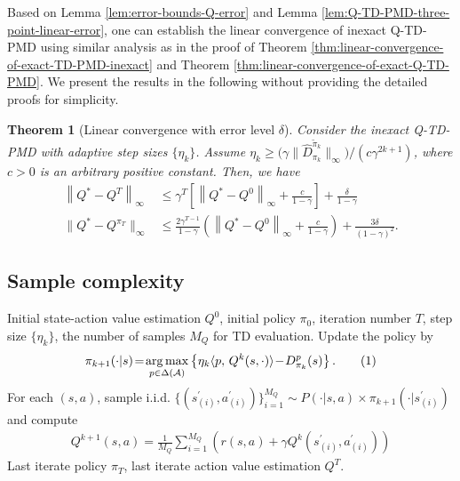 \documentclass[10pt]{article}
\newcommand{\calA}{\mathcal{A}}
\newcommand{\ls}{\left}
\newcommand{\rs}{\right}
\newcommand\numberthis{\addtocounter{equation}{1}\tag{\theequation}}
\theoremstyle{plain}
\newtheorem{theorem}{Theorem}[section]
\theoremstyle{definition}
\begin{document}
Based on Lemma \ref{lem:error-bounds-Q-error} and  Lemma \ref{lem:Q-TD-PMD-three-point-linear-error}, one can establish the linear convergence of inexact Q-TD-PMD using similar analysis as in the proof of Theorem \ref{thm:linear-convergence-of-exact-TD-PMD-inexact} and Theorem \ref{thm:linear-convergence-of-exact-Q-TD-PMD}. We present the results in the following without providing the detailed proofs for simplicity. 

\begin{theorem}[Linear convergence with error level $\delta$]
    \label{thm:linear-convergence-of-exact-Q-TD-PMD-inexact}
    Consider the inexact Q-TD-PMD  with adaptive step sizes $\{\eta_k\}$. Assume $\eta_k \geq {(\gamma\| {\hat{D}}_{\pi_k}^{\tilde{\pi}_k} \|_\infty})/{(c \gamma^{2k+1})}$, where $c > 0$ is an arbitrary positive constant. Then, we have
    \begin{align*}
        \ls\| Q^* - Q^T \rs\|_\infty &\leq \gamma^T \ls[ \ls\| Q^* - Q^0 \rs\|_\infty + \frac{c}{1-\gamma} \rs] + \frac{\delta}{1-\gamma} \\
\| Q^*-Q^{\pi _T}\| _{\infty}&\le \frac{2\gamma ^{T-1}}{1-\gamma}\left( \left\| Q^*-Q^0 \right\| _{\infty}+\frac{c}{1-\gamma} \right) +\frac{3\delta}{\left( 1-\gamma \right) ^2}.
\end{align*}
\end{theorem}


\subsection{Sample complexity}
\begin{algorithm}[!htbp]
   \caption{Sample-based Q-TD-PMD}
   \label{alg:sample-based-Q-TD-PMD}
\begin{algorithmic}
    {
    Initial state-action value estimation $Q^0$, initial policy $\pi_0$, iteration number $T$, step size $\{ \eta_k \}$, the number of samples $M_Q$ for TD evaluation.
   \vspace{0.2cm}
    Update the policy by
   \begin{align*}
       \pi_{k+1}(\cdot|s) \!=\! \underset{p\in\Delta(\calA)}{\arg\max} \ls\{ \eta_k \langle p, \, Q^{k}(s,\cdot) \rangle \!-\! D^p_{\pi_k}(s) \rs\}.\numberthis\label{eq:alg3pi}
   \end{align*}
    For each $(s,a)$, sample i.i.d. $\{(s^\prime_{(i)},a^\prime_{(i)}) \}_{i=1}^{M_Q} \sim P(\cdot|s,a)\times \pi_{k+1}(\cdot|s^\prime_{(i)})$ and compute 
\begin{align*}
Q^{k+1}\left( s,a \right) =\frac{1}{M_Q}\sum\nolimits_{i=1}^{M_Q}{\left( r\left( s,a \right) +\gamma Q^k\left( s_{\left( i \right)}^{\prime},a_{\left( i \right)}^{\prime} \right) \right)}
\end{align*}
   \ENDFOR
    Last iterate policy $\pi_T$, last iterate action value estimation $Q^T$.
   }
\end{algorithmic}
\end{algorithm}
\end{document}
